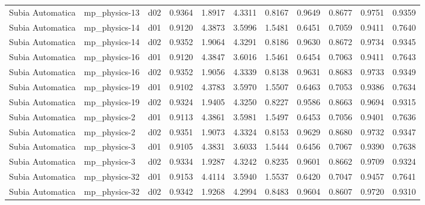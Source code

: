 \begin{longtable}{lllrrrrrrrr}
     Subia Automatica  &         mp\_physics-13 &     d02 &   0.9364 &   1.8917 &   4.3311 &       0.8167 &        0.9649 &       0.8677 &           0.9751 &  0.9359 \\
     Subia Automatica  &         mp\_physics-14 &     d01 &   0.9120 &   4.3873 &   3.5996 &       1.5481 &        0.6451 &       0.7059 &           0.9411 &  0.7640 \\
     Subia Automatica  &         mp\_physics-14 &     d02 &   0.9352 &   1.9064 &   4.3291 &       0.8186 &        0.9630 &       0.8672 &           0.9734 &  0.9345 \\
     Subia Automatica  &         mp\_physics-16 &     d01 &   0.9120 &   4.3847 &   3.6016 &       1.5461 &        0.6454 &       0.7063 &           0.9411 &  0.7643 \\
     Subia Automatica  &         mp\_physics-16 &     d02 &   0.9352 &   1.9056 &   4.3339 &       0.8138 &        0.9631 &       0.8683 &           0.9733 &  0.9349 \\
     Subia Automatica  &         mp\_physics-19 &     d01 &   0.9102 &   4.3783 &   3.5970 &       1.5507 &        0.6463 &       0.7053 &           0.9386 &  0.7634 \\
     Subia Automatica  &         mp\_physics-19 &     d02 &   0.9324 &   1.9405 &   4.3250 &       0.8227 &        0.9586 &       0.8663 &           0.9694 &  0.9315 \\
     Subia Automatica  &          mp\_physics-2 &     d01 &   0.9113 &   4.3861 &   3.5981 &       1.5497 &        0.6453 &       0.7056 &           0.9401 &  0.7636 \\
     Subia Automatica  &          mp\_physics-2 &     d02 &   0.9351 &   1.9073 &   4.3324 &       0.8153 &        0.9629 &       0.8680 &           0.9732 &  0.9347 \\
     Subia Automatica  &          mp\_physics-3 &     d01 &   0.9105 &   4.3831 &   3.6033 &       1.5444 &        0.6456 &       0.7067 &           0.9390 &  0.7638 \\
     Subia Automatica  &          mp\_physics-3 &     d02 &   0.9334 &   1.9287 &   4.3242 &       0.8235 &        0.9601 &       0.8662 &           0.9709 &  0.9324 \\
     Subia Automatica  &         mp\_physics-32 &     d01 &   0.9153 &   4.4114 &   3.5940 &       1.5537 &        0.6420 &       0.7047 &           0.9457 &  0.7641 \\
     Subia Automatica  &         mp\_physics-32 &     d02 &   0.9342 &   1.9268 &   4.2994 &       0.8483 &        0.9604 &       0.8607 &           0.9720 &  0.9310 \\

\end{longtable}
